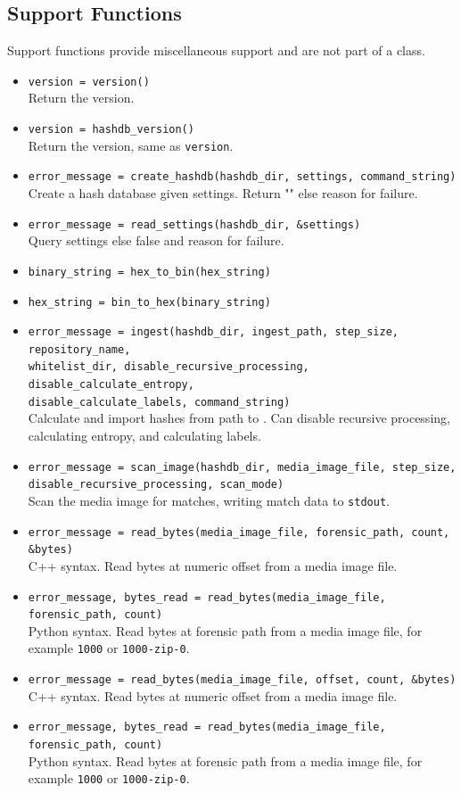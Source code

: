 \documentclass[11pt,fleqn]{article} %
\begin{document}
\subsection{Support Functions}
Support functions provide miscellaneous support and are not part of a class.
\begin{itemize}
\item \verb+version = version()+\\
Return the \hdb version.
\item \verb+version = hashdb_version()+\\
Return the \hdb version, same as \verb+version+.
\item \verb+error_message = create_hashdb(hashdb_dir, settings, command_string)+\\
Create a hash database given settings. Return "" else reason for failure.
\item \verb+error_message = read_settings(hashdb_dir, &settings)+\\
Query settings else false and reason for failure.
\item \verb+binary_string = hex_to_bin(hex_string)+
\item \verb+hex_string = bin_to_hex(binary_string)+
\item \verb+error_message = ingest(hashdb_dir, ingest_path, step_size, repository_name,+\\
\verb+whitelist_dir, disable_recursive_processing, disable_calculate_entropy,+\\
\verb+disable_calculate_labels, command_string)+\\
Calculate and import hashes from path to \hdb. Can disable recursive processing, calculating entropy, and calculating labels.
\item \verb+error_message = scan_image(hashdb_dir, media_image_file, step_size,+\\
\verb+disable_recursive_processing, scan_mode)+\\
Scan the media image for matches, writing match data to \verb+stdout+.
\item \verb+error_message = read_bytes(media_image_file, forensic_path, count, &bytes)+\\
C++ syntax.  Read bytes at numeric offset from a media image file.
\item \verb+error_message, bytes_read = read_bytes(media_image_file, forensic_path, count)+\\
Python syntax. Read bytes at forensic path from a media image file, for example \verb+1000+ or \verb+1000-zip-0+.
\item \verb+error_message = read_bytes(media_image_file, offset, count, &bytes)+\\
C++ syntax.  Read bytes at numeric offset from a media image file.
\item \verb+error_message, bytes_read = read_bytes(media_image_file, forensic_path, count)+\\
Python syntax. Read bytes at forensic path from a media image file, for example \verb+1000+ or \verb+1000-zip-0+.
\end{itemize}
\end{document}
